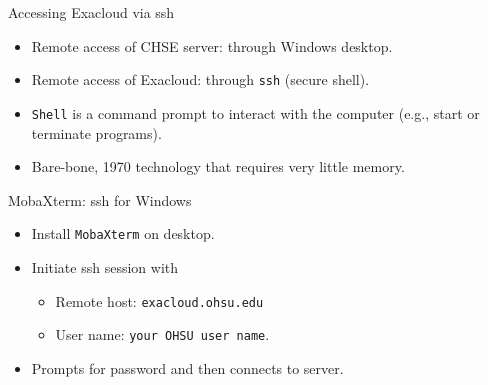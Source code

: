 \documentclass[12pt,t,xcolor=table]{beamer}
\begin{document}
\begin{frame}[fragile,label={sec:orgheadline9}]{Accessing Exacloud via ssh}
 \vspace{1.0em}

\begin{itemize}
\item Remote access of CHSE server: through Windows desktop.\setlength\itemsep{0.5em}

\item Remote access of Exacloud: through \texttt{ssh} (secure shell).

\item \texttt{Shell} is a command prompt to interact with the computer (e.g., start or terminate programs).

\item Bare-bone, 1970 technology that requires very little memory.
\end{itemize}
\end{frame}

\begin{frame}[fragile,label={sec:orgheadline10}]{MobaXterm: ssh for Windows}
 \vspace{1.0em}

\begin{itemize}
\item Install \texttt{MobaXterm} on desktop.\setlength\itemsep{0.5em}

\item Initiate ssh session with 
\begin{itemize}
\item Remote host: \texttt{exacloud.ohsu.edu}
\item User name: \texttt{your OHSU user name}.
\end{itemize}

\item Prompts for password and then connects to server.
\end{itemize}
\end{frame}
\end{document}
